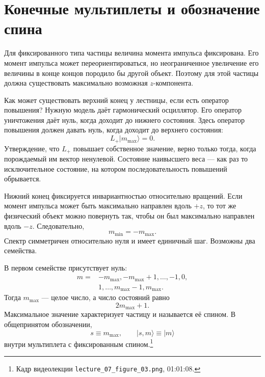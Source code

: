 \section{Конечные мультиплеты и обозначение спина}

Для фиксированного типа частицы величина момента импульса фиксирована. Его момент импульса может переориентироваться, но неограниченное увеличение его величины в конце концов породило бы другой объект. Поэтому для этой частицы должна существовать максимально возможная \(z\)-компонента.

Как может существовать верхний конец у лестницы, если есть оператор повышения? Нужную модель даёт гармонический осциллятор. Его оператор уничтожения даёт нуль, когда доходит до нижнего состояния. Здесь оператор повышения должен давать нуль, когда доходит до верхнего состояния: \begin{equation}
L_+\lvert m_{\max}\rangle=0.
\end{equation} Утверждение, что \(L_+\) повышает собственное значение, верно только тогда, когда порождаемый им вектор ненулевой. Состояние наивысшего веса — как раз то исключительное состояние, на котором последовательность повышений обрывается.

Нижний конец фиксируется инвариантностью относительно вращений. Если момент импульса может быть максимально направлен вдоль \(+z\), то тот же физический объект можно повернуть так, чтобы он был максимально направлен вдоль \(-z\). Следовательно, \begin{equation}
m_{\min}=-m_{\max}.
\end{equation} Спектр симметричен относительно нуля и имеет единичный шаг. Возможны два семейства.

В первом семействе присутствует нуль: \begin{equation}
\begin{aligned}
m={}&-m_{\max},-m_{\max}+1,\ldots,-1,0,\\
&1,\ldots,m_{\max}-1,m_{\max}.
\end{aligned}
\end{equation} Тогда \(m_{\max}\) — целое число, а число состояний равно \begin{equation}
2m_{\max}+1.
\end{equation} Максимальное значение характеризует частицу и называется её спином. В общепринятом обозначении, \begin{equation}
s\equiv m_{\max},
\qquad
\lvert s,m\rangle\equiv\lvert m\rangle
\end{equation} внутри мультиплета с фиксированным спином.\footnote{\raggedright Кадр видеолекции \nolinkurl{lecture_07_figure_03.png}, 01:01:08.\par}

